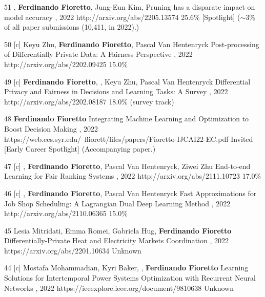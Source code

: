 \begin{pubs}
\confentryAwd
	{51} %
	{, {\bf Ferdinando Fioretto}, Jung-Eun Kim, }
	{Pruning has a disparate impact on model accuracy}
	{\procNeurIPS, 2022}
	{http://arxiv.org/abs/2205.13574}
	{25.6\%}
	{[Spotlight]}
	{($\sim$3\% of all paper submissions (10,411, in 2022).)}

\confentry
	{50} %
	{[c] Keyu Zhu, {\bf Ferdinando Fioretto}, Pascal Van Hentenryck}
	{Post-processing of Differentially Private Data: A Fairness Perspective}
	{\procIJCAI, 2022}
	{http://arxiv.org/abs/2202.09425}	
	{15.0\%}

\confentry
	{49} %
	{[c] {\bf Ferdinando Fioretto}, , Keyu Zhu, Pascal Van Hentenryck}
	{Differential Privacy and Fairness in Decisions and Learning Tasks: A Survey}
	{\procIJCAI, 2022}
	{http://arxiv.org/abs/2202.08187}	
	{18.0\% (survey track)}

\confentryAwd
	{48} %
	{{\bf Ferdinando Fioretto}}
	{Integrating Machine Learning and Optimization to Boost Decision Making}
	{\procIJCAI, 2022}
	{https://web.ecs.syr.edu/~ffiorett/files/papers/Fioretto-IJCAI22-EC.pdf}	
	{Invited}
	{[Early Career Spotlight]}
	{(Accompanying paper.)}

\confentry
	{47} %
	{[c] , {\bf Ferdinando Fioretto}, Pascal Van Hentenryck, Ziwei Zhu}
	{End-to-end Learning for Fair Ranking Systems}
	{\procWWW, 2022}
	{http://arxiv.org/abs/2111.10723}	
	{17.0\%}

\confentry
	{46} %
	{[c] , {\bf Ferdinando Fioretto}, Pascal Van Hentenryck}
	{Fast Approximations for Job Shop Scheduling: A Lagrangian Dual Deep Learning Method}
	{\procAAAI, 2022}
	{http://arxiv.org/abs/2110.06365}
	{15.0\%}

\confentry
	{45} %
	{Lesia Mitridati, Emma Romei, Gabriela Hug, {\bf Ferdinando Fioretto}}
	{Differentially-Private Heat and Electricity Markets Coordination}
	{\procPMAPS, 2022}
	{https://arxiv.org/abs/2201.10634}
	{Unknown}

\confentry
	{44} %
	{[c] Mostafa Mohammadian, Kyri Baker, , {\bf Ferdinando Fioretto}}
	{Learning Solutions for Intertemporal Power Systems Optimization with Recurrent Neural Networks}
	{\procPMAPS, 2022}
	{https://ieeexplore.ieee.org/document/9810638}
	{Unknown}



\end{pubs}
